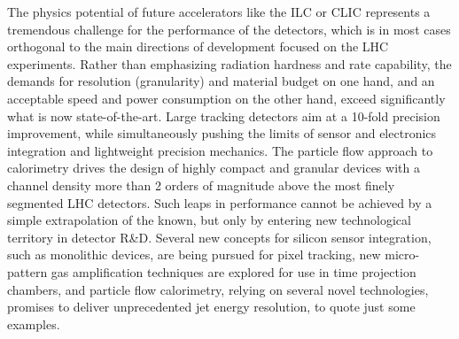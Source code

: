 \documentclass[10pt,final]{report}
\begin{document}
The physics potential of future accelerators like the ILC or CLIC represents a tremendous challenge for the performance of the detectors, which is in most cases orthogonal to the main directions of development focused on the LHC experiments. Rather than emphasizing radiation hardness and rate capability, the demands for resolution (granularity) and material budget on one hand, and an acceptable speed and power consumption on the other hand, exceed significantly what is now state-of-the-art. Large tracking detectors aim at a 10-fold precision improvement, while simultaneously pushing the limits of sensor and electronics integration and lightweight precision mechanics. The particle flow approach to calorimetry drives the design of highly compact and granular devices with a channel density more than 2 orders of magnitude above the most finely segmented LHC detectors. Such leaps in performance cannot be achieved by a simple extrapolation of the known, but only by entering new technological territory in detector R\&D. Several new concepts for silicon sensor integration, such as monolithic devices, are being pursued for pixel tracking, new micro-pattern gas amplification techniques are explored for use in time projection chambers, and particle flow calorimetry, relying on several novel technologies, promises to deliver unprecedented jet energy resolution, to quote just some examples.
\end{document}
